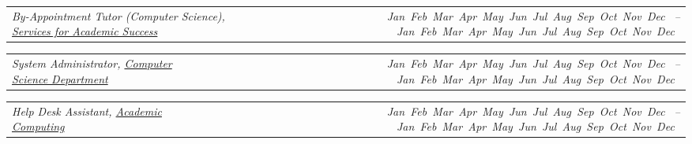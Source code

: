 \documentclass[9pt,letterpaper]{extarticle}
\makeatletter
\newcommand{\headerrow}[2]
{\begin{tabular*}{\linewidth}{l@{\extracolsep{\fill}}r}
	#1 &
	#2 \\
\end{tabular*}}
\newcommand{\DatestampYM}[2]{\mbox{\ShortMonth{#2}#1}}
\newcommand{\ShortMonth}[1]{
\ifcase#1\relax
\or Jan
\or Feb
\or Mar
\or Apr
\or May
\or Jun
\or Jul
\or Aug
\or Sep
\or Oct
\or Nov
\or Dec
\fi}
\makeatother
\begin{document}
\begin{itemize}
	\headerrow
		{\emph{By-Appointment Tutor (Computer Science), \href{https://www.rocky.edu/academics/academic-support/services-academic-success}{Services for Academic Success}}}
		{\emph{\DatestampYM{2012}{09} --\DatestampYM{2014}{05}}}
	\headerrow
		{\emph{System Administrator, \href{http://cs.rocky.edu}{Computer Science Department}}}
		{\emph{\DatestampYM{2012}{03} --\DatestampYM{2014}{05}}}
	\headerrow
		{\emph{Help Desk Assistant, \href{https://www.rocky.edu/resources/offices-departments/academic-computing}{Academic Computing}}}
		{\emph{\DatestampYM{2011}{09} --\DatestampYM{2013}{05}}}

\end{itemize}
\end{document}
